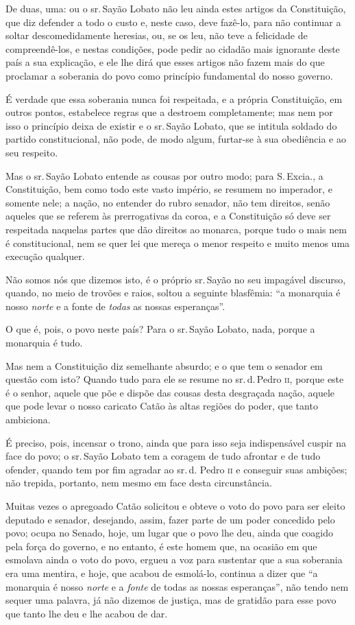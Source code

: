 De duas, uma: ou o sr.\,Sayão Lobato não leu ainda estes artigos da
Constituição, que diz defender a todo o custo e, neste caso, deve
fazê-lo, para não continuar a soltar descomedidamente heresias, ou, se
os leu, não teve a felicidade de compreendê-los, e nestas condições,
pode pedir ao cidadão mais ignorante deste país a sua explicação, e ele
lhe dirá que esses artigos não fazem mais do que proclamar a soberania
do povo como princípio fundamental do nosso governo.

É verdade que essa soberania nunca foi respeitada, e a própria
Constituição, em outros pontos, estabelece regras que a destroem
completamente; mas nem por isso o princípio deixa de existir e o sr.\,Sayão Lobato, que se intitula soldado do partido constitucional, não
pode, de modo algum, furtar-se à sua obediência e ao seu respeito.

Mas o sr.\,Sayão Lobato entende as cousas por outro modo; para S.\,Excia.,
a Constituição, bem como todo este vasto império, se resumem no
imperador, e somente nele; a nação, no entender do rubro senador, não
tem direitos, senão aqueles que se referem às prerrogativas da coroa, e
a Constituição só deve ser respeitada naquelas partes que dão direitos
ao monarca, porque tudo o mais nem é constitucional, nem se quer lei que
mereça o menor respeito e muito menos uma execução qualquer.

Não somos nós que dizemos isto, é o próprio sr.\,Sayão no seu impagável
discurso, quando, no meio de trovões e raios, soltou a seguinte
blasfêmia: ``a monarquia é nosso \emph{norte} e a fonte de \emph{todas}
as nossas esperanças''.

O que é, pois, o povo neste país? Para o sr.\,Sayão Lobato, nada, porque
a monarquia é tudo.

Mas nem a Constituição diz semelhante absurdo; e o que tem o senador em
questão com isto? Quando tudo para ele se resume no sr.\,d.\,Pedro \textsc{ii},
porque este é o senhor, aquele que põe e dispõe das cousas desta
desgraçada nação, aquele que pode levar o nosso caricato Catão às altas
regiões do poder, que tanto ambiciona.

É preciso, pois, incensar o trono, ainda que para isso seja
indispensável cuspir na face do povo; o sr.\,Sayão Lobato tem a coragem
de tudo afrontar e de tudo ofender, quando tem por fim agradar ao sr.\,d.
Pedro \textsc{ii} e conseguir suas ambições; não trepida, portanto, nem mesmo em
face desta circunstância.

Muitas vezes o apregoado Catão solicitou e obteve o voto do povo para
ser eleito deputado e senador, desejando, assim, fazer parte de um poder
concedido pelo povo; ocupa no Senado, hoje, um lugar que o povo lhe deu,
ainda que coagido pela força do governo, e no entanto, é este homem que,
na ocasião em que esmolava ainda o voto do povo, ergueu a voz para
sustentar que a sua soberania era uma mentira, e hoje, que acabou de
esmolá-lo, continua a dizer que ``a monarquia é nosso \emph{norte} e a
\emph{fonte} de todas as nossas esperanças'', não tendo nem sequer uma
palavra, já não dizemos de justiça, mas de gratidão para esse povo que
tanto lhe deu e lhe acabou de dar.

